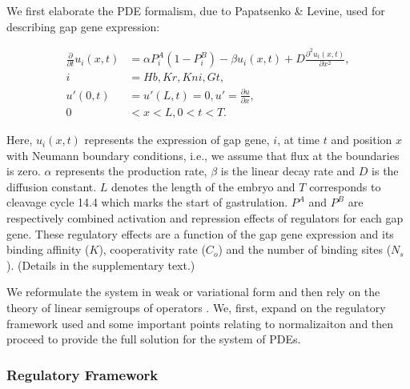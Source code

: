 We first elaborate the PDE formalism, due to Papatsenko \& Levine, used for describing gap gene expression:

\begin{align*}
	\frac{\partial }{\partial t}u_{i}(x,t) &= \alpha P_{i}^{A}(1 - P_{i}^{B}) - \beta u_{i}(x,t) + D \frac{\partial^2 u_{i}(x,t)}{\partial x^2}, \\
	i &= Hb, Kr, Kni, Gt, \\
	u'(0,t) &= u'(L,t) = 0, u' = \frac{\partial u}{\partial x}, \\
	0 &< x < L, 0 < t < T.
\end{align*}

Here, $u_{i}(x,t)$ represents the expression of gap gene, $i$, at time $t$ and position $x$ with Neumann boundary conditions, i.e., we assume that flux at the boundaries is zero.  $\alpha$ represents the production rate, $\beta$ is the linear decay rate and $D$ is the diffusion constant. $L$ denotes the length of the embryo and $T$ corresponds to cleavage cycle 14.4 which marks the start of gastrulation. $P^A$ and $P^B$ are respectively combined activation and repression effects of regulators for each gap gene. These regulatory effects are a function of the gap gene expression and its binding affinity ($K$), cooperativity rate ($C_o$) and the number of binding sites ($N_s$). (Details in the supplementary text.) 

We reformulate the system in weak or variational form \cite{lions71} and then rely on the theory of linear semigroups of operators \cite{pazy83}. We, first, expand on the regulatory framework used and some important points relating to normalizaiton and then proceed to provide the full solution for the system of PDEs.

\subsubsection{Regulatory Framework}

